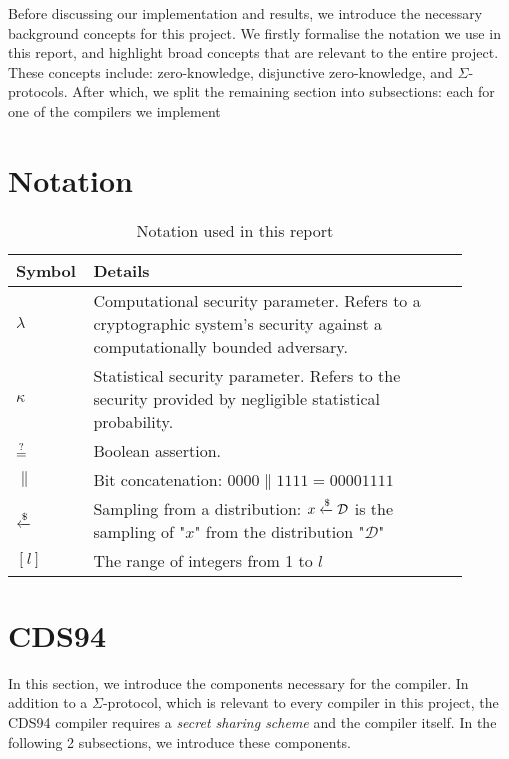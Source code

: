 Before discussing our implementation and results, we introduce the necessary background concepts for this project. 
We firstly formalise the notation we use in this report, and highlight broad concepts that are relevant to the entire project. 
These concepts include: zero-knowledge, disjunctive zero-knowledge, and $\Sigma$-protocols. 
After which, we split the remaining section into subsections: 
each for one of the compilers we implement \cite{CDS94, StackingSigmas}%

\section{Notation}\label{sec:notation}
\begin{table}[h]
  \centering
  \label{tab:notation}
  \caption{Notation used in this report}
  \begin{tabular}{|A{0.1\linewidth}|M{0.8\linewidth}|}
    \hline
    Symbol & Details \\\hline
    $\lambda$ & Computational security parameter. Refers to a cryptographic system's security 
    against a computationally bounded adversary. \\\hline
    $\kappa$ & Statistical security parameter. Refers to the security provided by negligible statistical probability. \\\hline
    $\overset {?} {=}$ & Boolean assertion. \\\hline
    $\|$ & Bit concatenation: $0000 \| 1111 = 00001111$ \\\hline
    $\xleftarrow{\$}$ & Sampling from a distribution: $x \xleftarrow{\$} \mathcal D$ is the sampling of "$x$" from 
    the distribution "$\mathcal D$" \\
    \hline
    $[l]$ & The range of integers from 1 to $l$ \\
    \hline
  \end{tabular}
\end{table}







\section{CDS94}
In this section, we introduce the components necessary for the \cite{CDS94} compiler. In addition to a $\Sigma$-protocol, which 
is relevant to every compiler in this project, the CDS94 compiler requires a \emph{secret sharing scheme} and the compiler 
itself. In the following 2 subsections, we introduce these components.



